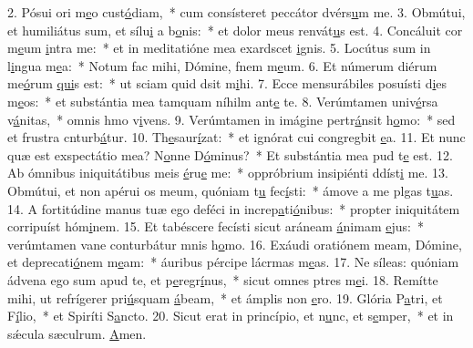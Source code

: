 2. Pósui ori m\uline{e}o cust\uline{ó}diam,~* cum consísteret peccátor dvérs\uline{u}m me.
3. Obmútui, et humiliátus sum, et sílu\uline{i} a b\uline{o}nis:~* et dolor meus renvát\uline{u}s est.
4. Concáluit cor m\uline{e}um \uline{i}ntra me:~* et in meditatióne mea exardscet \uline{i}gnis.
5. Locútus sum in l\uline{i}ngua m\uline{e}a:~* Notum fac mihi, Dómine, fnem m\uline{e}um.
6. Et númerum diérum me\uline{ó}rum \uline{qui}s est:~* ut sciam quid dsit m\uline{i}hi.
7. Ecce mensurábiles posuísti d\uline{i}es m\uline{e}os:~* et substántia mea tamquam níhilm ant\uline{e} te.
8. Verúmtamen univ\uline{é}rsa v\uline{á}nitas,~* omnis hmo v\uline{i}vens.
9. Verúmtamen in imágine pertr\uline{á}nsit h\uline{o}mo:~* sed et frustra cnturb\uline{á}tur.
10. Th\uline{e}saur\uline{í}zat:~* et ignórat cui congregbit \uline{e}a.
11. Et nunc quæ est exspectátio mea? N\uline{o}nne D\uline{ó}minus?~* Et substántia mea pud t\uline{e} est.
12. Ab ómnibus iniquitátibus meis \uline{é}ru\uline{e} me:~* oppróbrium insipiénti ddíst\uline{i} me.
13. Obmútui, et non apérui os meum, quóniam t\uline{u} fec\uline{í}sti:~* ámove a me plgas t\uline{u}as.
14. A fortitúdine manus tuæ ego deféci in increp\uline{a}ti\uline{ó}nibus:~* propter iniquitátem corripuíst hóm\uline{i}nem.
15. Et tabéscere fecísti sicut aráneam \uline{á}nimam \uline{e}jus:~* verúmtamen vane conturbátur mnis h\uline{o}mo.
16. Exáudi oratiónem meam, Dómine, et deprecati\uline{ó}nem m\uline{e}am:~* áuribus pércipe lácrmas m\uline{e}as.
17. Ne síleas: quóniam ádvena ego sum apud te, et p\uline{e}regr\uline{í}nus,~* sicut omnes ptres m\uline{e}i.
18. Remítte mihi, ut refrígerer pri\uline{ú}squam \uline{á}beam,~* et ámplis non \uline{e}ro.
19. Glória P\uline{a}tri, et F\uline{í}lio,~* et Spiríti S\uline{a}ncto.
20. Sicut erat in princípio, et n\uline{u}nc, et s\uline{e}mper,~* et in sǽcula sæculrum. \uline{A}men.
